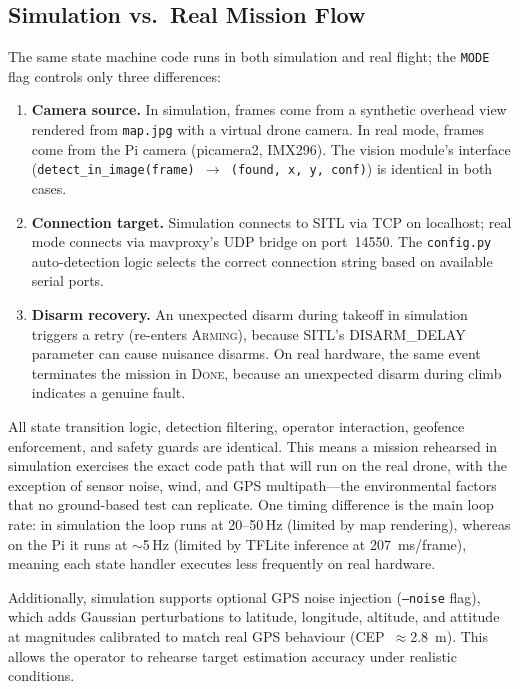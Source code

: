 \subsection{Simulation vs.\ Real Mission Flow}\label{sec:mf-sim-vs-real}

The same state machine code runs in both simulation and real flight; the \texttt{MODE} flag controls only three differences:

\begin{enumerate}
  \item \textbf{Camera source.}  In simulation, frames come from a synthetic overhead view rendered from \texttt{map.jpg} with a virtual drone camera.  In real mode, frames come from the Pi camera (picamera2, IMX296).  The vision module's interface (\texttt{detect\_in\_image(frame) $\rightarrow$ (found, x, y, conf)}) is identical in both cases.
  \item \textbf{Connection target.}  Simulation connects to SITL via TCP on localhost; real mode connects via mavproxy's UDP bridge on port~14550.  The \texttt{config.py} auto-detection logic selects the correct connection string based on available serial ports.
  \item \textbf{Disarm recovery.}  An unexpected disarm during takeoff in simulation triggers a retry (re-enters \textsc{Arming}), because SITL's DISARM\_DELAY parameter can cause nuisance disarms.  On real hardware, the same event terminates the mission in \textsc{Done}, because an unexpected disarm during climb indicates a genuine fault.
\end{enumerate}

\noindent All state transition logic, detection filtering, operator interaction, geofence enforcement, and safety guards are identical.  This means a mission rehearsed in simulation exercises the exact code path that will run on the real drone, with the exception of sensor noise, wind, and GPS multipath---the environmental factors that no ground-based test can replicate.  One timing difference is the main loop rate: in simulation the loop runs at 20--50\,Hz (limited by map rendering), whereas on the Pi it runs at ${\sim}$5\,Hz (limited by TFLite inference at \SI{207}{\milli\second}/frame), meaning each state handler executes less frequently on real hardware.

Additionally, simulation supports optional GPS noise injection (\texttt{--noise} flag), which adds Gaussian perturbations to latitude, longitude, altitude, and attitude at magnitudes calibrated to match real GPS behaviour (CEP~$\approx$\SI{2.8}{\metre}).  This allows the operator to rehearse target estimation accuracy under realistic conditions.

